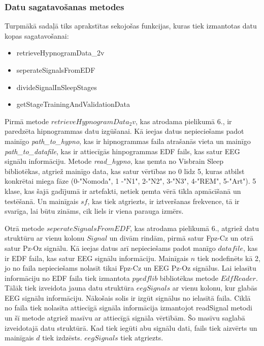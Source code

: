\documentclass[12pt,paper=A4]{report}
\begin{document}
\subsubsection{Datu sagatavošanas metodes}
Turpmākā sadaļā tiks aprakstītas sekojošas funkcijas, kuras tiek izmantotas datu kopas sagatavošanai:

\begin{itemize}
\item retrieveHypnogramData_2v
\item seperateSignalsFromEDF
\item divideSignalInSleepStages
\item getStageTrainingAndValidationData
\end{itemize}

Pirmā metode $retrieveHypnogramData_2v$, kas atrodama pielikumā 6., ir paredzēta hipnogrammas datu izgūšanai. Kā ieejas datus nepieciešams padot mainīgo \textit{path_to_hypno}, kas ir hipnogrammas faila atrašanās vieta un mainīgo \textit{path_to_datafile}, kas ir attiecīgās hinpogrammas EDF fails, kas satur EEG signālu informāciju. Metode \textit{read_hypno}, kas ņemta no Visbrain Sleep bibliotēkas, atgriež mainīgo data, kas satur vērtības no 0 līdz 5, kuras atbilst konkrētai miega fāze (0-"Nomoda", 1 -"N1", 2-"N2", 3-"N3", 4-"REM", 5-"Art"). 5 klase, kas šajā gadījumā ir artefakti, netiek ņemta vērā tīkla apmācīšanā un testēšanā. Un mainīgais $sf$, kas tiek atgriezts, ir iztveršanas frekvence, tā ir svarīga, lai būtu zināms, cik liels ir viena parauga izmērs. 
 

Otrā metode $seperateSignalsFromEDF$, kas atrodama pielikumā 6., atgriež datu struktūru ar vienu kolonu $Signal$ un divām rindām, pirmā satur Fpz-Cz un otrā satur Pz-Oz signālu. Kā ieejas datus arī nepieciešams padot manīgo $datafile$, kas ir EDF faila, kas satur EEG signālu informāciju. Mainīgais $n$ tiek nodefinēts kā 2, jo no faila nepieciešams nolasīt tikai Fpz-Cz un EEG Pz-Oz signālus. Lai ielasītu informāciju no EDF faila tiek izmantota $pyedflib$ bibliotēkas metode $EdfReader$. Tālāk tiek izveidota jauna datu struktūra $eegSignals$ ar vienu kolonu, kur glabās EEG signālu informāciju. Nākošais solis ir izgūt signālus no ielasītā faila. Ciklā no faila tiek nolasīta attiecīgā signāla informācija izmantojot readSignal metodi un šī metode atgriež masīvu ar attiecīgā signāla vērtībām. Šo masīvu saglabā izveidotajā datu struktūrā. Kad tiek iegūti abu signālu dati, fails tiek aizvērts un mainīgais $d$ tiek izdzēsts. $eegSignals$ tiek atgriezts. 
\end{document}

